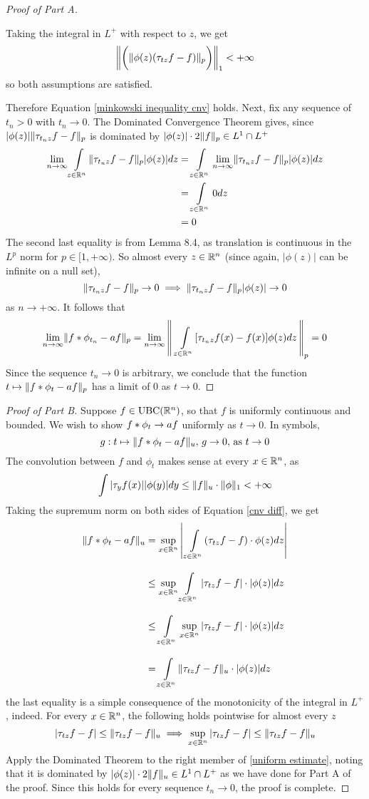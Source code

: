 \documentclass[../../main.tex]{subfiles}
\begin{document}
\begin{proof}[Proof of Part A]
\begin{enumerate}
        Taking the integral in $L^+$ with respect to $z$, we get
        \[\left\lVert {\biggl(\lVert {\phi(z)(\tau_{tz}f-f)} \rVert_p\biggr)} \right\rVert_1<+\infty\]
        so both assumptions are satisfied.
    \end{enumerate}
    Therefore Equation \eqref{minkowski inequality cnv} holds. Next, fix any sequence of $t_n>0$ with $t_n\to 0$. The Dominated Convergence Theorem gives, since $|\phi(z)|\lVert {\tau_{t_nz}f-f} \rVert_p$ is dominated by $|\phi(z)|\cdot2\lVert {f} \rVert_p\in L^1\cap L^+$
    \begin{align*}
    \lim_{n\to\infty}\int\limits_{z\in\mathbb{R}^n}\lVert {\tau_{t_nz}f-f} \rVert_p|\phi(z)|dz&=\int\limits_{z\in\mathbb{R}^n}\lim_{n\to\infty}\lVert {\tau_{t_nz}f-f} \rVert_p|\phi(z)|dz\\
    &=\int\limits_{z\in\mathbb{R}^n} 0 dz\\
    &= 0
    \end{align*}
    The second last equality is from Lemma 8.4, as translation is continuous in the $L^p$ norm for $p\in[1,+\infty)$. So almost every $z\in\mathbb{R}^n$ (since again, $|\phi(z)|$ can be infinite on a null set),
    \[\lVert {\tau_{t_nz}f-f} \rVert_p\to 0\implies\lVert {\tau_{t_nz}f-f} \rVert_p|\phi(z)|\to 0\]
    as $n\to+\infty$. It follows that
    \[\lim_{n\to\infty}\lVert {f\ast\phi_{t_n}-af} \rVert_p=\lim_{n\to\infty}\left\lVert {\,\,\int\limits_{z\in\mathbb{R}^n}[\tau_{t_nz}f(x)-f(x)]\phi(z)dz\,} \right\rVert_p =0\]
    Since the sequence $t_n\to 0$ is arbitrary, we conclude that the function $t\mapsto \lVert {f\ast\phi_{t}-af} \rVert_p$ has a limit of $0$ as $t\to 0$.
\end{proof}
\begin{proof}[Proof of Part B]
    Suppose $f\in \operatorname{UBC}(\mathbb{R}^n)$, so that $f$ is uniformly continuous and bounded. We wish to show $f\ast \phi_t\to af$ uniformly as $t\to 0$. In symbols,
    \[g:t\mapsto\lVert {f\ast\phi_t-af} \rVert_u,\,g\to 0,\,\text{as }t\to 0\]
    The convolution between $f$ and $\phi_t$ makes sense at every $x\in\mathbb{R}^n$, as \[\int|\tau_yf(x)||\phi(y)|dy\leq \lVert {f} \rVert_u\cdot\lVert {\phi} \rVert_1<+\infty\]
    Taking the supremum norm on both sides of Equation \eqref{cnv diff}, we get
    \begin{align}
        \lVert {f\ast\phi_t -af} \rVert_u &= \sup_{x\in\mathbb{R}^n}\left|\,\int\limits_{z\in\mathbb{R}^n}(\tau_{tz}f-f)\cdot\phi(z)dz\right|\nonumber\\[2ex]
        &\leq \sup_{x\in\mathbb{R}^n}\int\limits_{z\in\mathbb{R}^n}|\tau_{tz}f-f|\cdot|\phi(z)|dz\nonumber\\[2ex]
        &\leq\int\limits_{z\in\mathbb{R}^n}\sup_{x\in\mathbb{R}^n}|    \tau_{tz}f-f|\cdot|\phi(z)|dz\nonumber\\[2ex]
        &=\int\limits_{z\in\mathbb{R}^n}\lVert {\tau_{tz}f-f} \rVert_u\cdot|\phi(z)|dz\label{uniform estimate}
    \end{align}
    the last equality is a simple consequence of the monotonicity of the integral in $L^+$, indeed. For every $x\in\mathbb{R} ^n$, the following holds pointwise for almost every $z$\[|\tau_{tz}f-f|\leq\lVert {\tau_{tz}f-f} \rVert_u\implies\sup_{x\in\mathbb{R}^n}|\tau_{tz}f-f|\leq\lVert {\tau_{tz}f-f} \rVert_u\]
    Apply the Dominated Theorem to the right member of \eqref{uniform estimate}, noting that it is dominated by $|\phi(z)|\cdot2\lVert {f} \rVert_u\in L^1\cap L^+$ as we have done for Part A of the proof. Since this holds for every sequence $t_n\to 0$, the proof is complete.
\end{proof}
\end{document}

